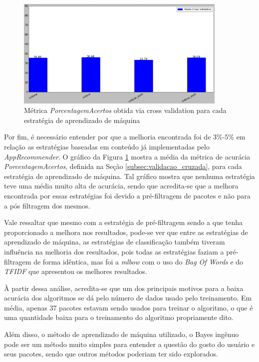 \begin{figure}[h]
  \centering
  \includegraphics[width=0.9\textwidth]{figuras/segundo_experimento_cross_validation.eps}
    \caption{Métrica \textit{PorcentagemAcertos} obtida via cross validation para
    cada estratégia de aprendizado de máquina}
  \label{fig:segundo_experimento_cross_validation}
\end{figure}

Por fim, é necessário entender por que a melhoria encontrada foi de 3\%-5\% em
relação as estratégias baseadas em conteúdo já implementadas pelo
\textit{AppRecommender}. O gráfico da Figura \ref{fig:segundo_experimento_cross_validation}
mostra a média da métrica de acurácia \textit{PorcentagemAcertos}, definida na Seção
\ref{subsec:validacao_cruzada}, para cada estratégia de aprendizado de máquina.
Tal gráfico mostra que nenhuma estratégia teve uma média muito alta de acurácia,
sendo que acredita-se que a melhora encontrada por essas estratégias foi devido a
pré-filtragem de pacotes e não para a pós filtragem dos mesmos.

Vale ressaltar que mesmo com a estratégia de pré-filtragem sendo a que tenha
proporcionado a melhora nos resultados, pode-se ver que entre as estratégias de
aprendizado de máquina, as estratégias de classificação também tiveram influência
na melhoria dos resultados, pois todas as estratégias faziam a pré-filtragem de
forma idêntica, mas foi a \textit{mlbow} com o uso do \textit{Bag Of Words} e do
\textit{TFIDF} que apresentou os melhores resultados.

À partir dessa análise, acredita-se que um dos principais motivos para a baixa acurácia dos algoritmos
se dá pelo número de dados usado pelo treinamento. Em média, apenas 37 pacotes
estavam sendo usados para treinar o algoritmo, o que é uma
quantidade baixa para o treinamento do algoritmo propriamente dito.

Além disso, o método de aprendizado de máquina utilizado, o Bayes ingênuo pode
ser um método muito simples para entender a questão do gosto do usuário e seus
pacotes, sendo que outros métodos poderiam ter sido explorados.
